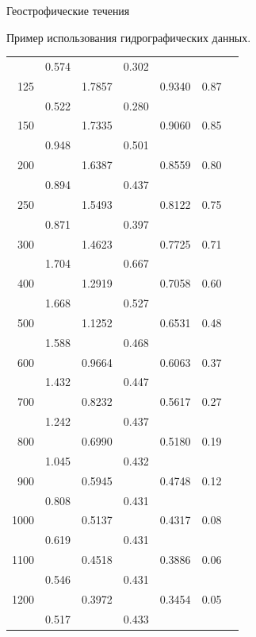 \begin{chapter}{Геострофические течения}
\begin{section}{Пример использования гидрографических данных.}
\begin{table}[t!]
\begin{center}
\begin{small}
\begin{tabular}{rrrrrrl}
 &      0.574  &       & 0.302              \\
125&            &   1.7857&        &    0.9340& 0.87\\
 &      0.522  &       & 0.280              \\
150&               &    1.7335&        &    0.9060& 0.85\\
 &      0.948  &       & 0.501              \\
200&               &    1.6387&        &    0.8559& 0.80\\
 &      0.894  &       & 0.437              \\
250&            &   1.5493&        &    0.8122& 0.75\\
 &      0.871  &       & 0.397              \\
300&               &    1.4623&        &    0.7725& 0.71\\
 &      1.704  &       & 0.667              \\
400&               &    1.2919&        &    0.7058& 0.60\\
 &      1.668  &       & 0.527              \\
500&               &    1.1252&        &    0.6531& 0.48\\
 &      1.588  &       & 0.468              \\
600&               &    0.9664&        &    0.6063& 0.37\\
 &      1.432  &       & 0.447              \\
700&               &    0.8232&        &    0.5617& 0.27\\
 &      1.242  &       & 0.437              \\
800&               &    0.6990&        &    0.5180& 0.19\\
 &      1.045  &       & 0.432              \\
900&               &    0.5945&        &    0.4748& 0.12\\
 &      0.808  &       & 0.431              \\
1000&             & 0.5137&        &    0.4317& 0.08\\
 &      0.619  &       & 0.431              \\
1100&             & 0.4518&        &    0.3886& 0.06\\
 &      0.546  &       & 0.431              \\
1200&             & 0.3972&        &    0.3454& 0.05\\
 &      0.517  &       & 0.433              \\

\end{tabular}
\end{small}
\end{center}
\end{table}
\end{section}
\end{chapter}
